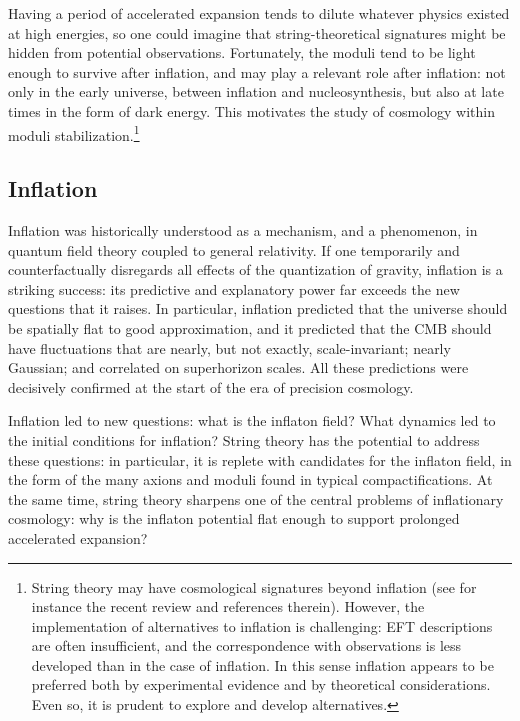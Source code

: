 \documentclass[12pt,a4wide]{article}
\begin{document}
Having a period of accelerated expansion tends to dilute whatever physics existed at high energies, so one could imagine that 
string-theoretical signatures might be hidden from potential observations. Fortunately, the moduli tend to be light enough to survive after inflation, and may play a relevant role after inflation: not only in the early universe, between inflation and nucleosynthesis, but also at late times in the form of dark energy. This motivates the study of cosmology within moduli stabilization.\footnote{String theory may have cosmological signatures beyond inflation (see for instance the recent review \cite{Cicoli:2023opf} and references therein). However, the implementation of alternatives to inflation is challenging: EFT descriptions are often insufficient, and the correspondence with observations is less developed than in the case of inflation.
In this sense inflation appears to be preferred both by experimental evidence and by theoretical considerations.  Even so, it is prudent to explore and develop alternatives.}

\subsection{Inflation}
  
Inflation was historically understood as a mechanism, and a phenomenon, in quantum field theory coupled to general relativity.
If one temporarily and counterfactually disregards all effects of the quantization of gravity, inflation is a striking success: its predictive and explanatory power far exceeds the new questions that it raises.  In particular, inflation predicted that the universe should be spatially flat to good approximation, and it predicted that the CMB should have fluctuations that are nearly, but not exactly, scale-invariant; nearly Gaussian; and correlated on superhorizon scales.  All these predictions were decisively confirmed at the start of the era of precision cosmology. 

Inflation led to new questions: what is the inflaton field? What dynamics led to the initial conditions for inflation?  
String theory has the potential to address these questions: in particular, it is replete with candidates for the inflaton field, in the form of the many axions and moduli found in typical compactifications.
At the same time, string theory sharpens one of the central problems of inflationary cosmology: why is the inflaton potential flat enough to support prolonged accelerated expansion?
\end{document}
